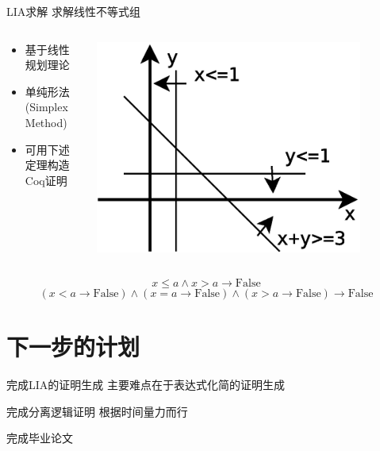 \documentclass{beamer}
\begin{document}
\begin{frame}[fragile]
  \begin{block}{LIA求解}
      求解线性不等式组
  \end{block}
  \begin{block}{}
    \begin{columns}
      
      \begin{column}{0.45\textwidth}
        \begin{itemize}
         \item 基于线性规划理论
         \item 单纯形法(Simplex Method)
         \item 可用下述定理构造Coq证明
        \end{itemize}
      \end{column}

      \begin{column}{0.45\textwidth}
        \includegraphics[width=0.85\textwidth]{arith.eps}
      \end{column}

    \end{columns}

  \end{block}

  \begin{block}{}
           $$x \leq a \land x > a \rightarrow \mathrm{False}$$
           $$
           (x < a \rightarrow \mathrm{False}) \land
           (x = a \rightarrow \mathrm{False}) \land
           (x > a \rightarrow \mathrm{False}) \rightarrow \mathrm{False}
           $$
  \end{block}
\end{frame}

\section{下一步的计划}
\begin{frame}[fragile]
  \begin{block}{完成LIA的证明生成}
    主要难点在于表达式化简的证明生成
  \end{block}

  \begin{block}{完成分离逻辑证明}
    根据时间量力而行
  \end{block}

  \begin{block}{完成毕业论文}
  \end{block}
\end{frame}
\end{document}
